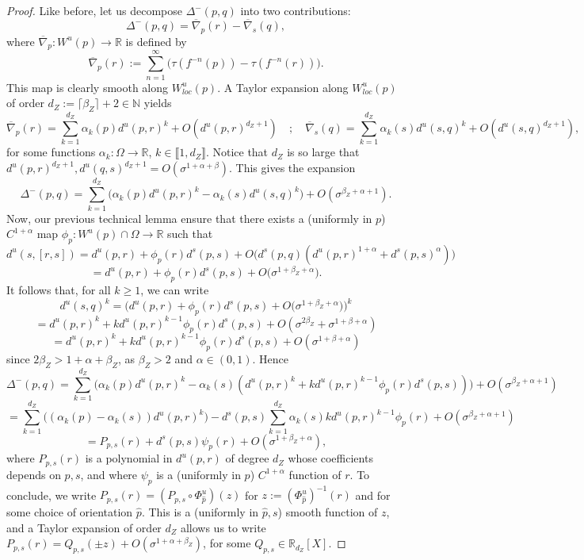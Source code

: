 \documentclass[a4paper]{article}
\theoremstyle{definition}
\begin{document}
\begin{proof}
Like before, let us decompose $\Delta^-(p,q)$ into two contributions:
$$ \Delta^-(p,q) = \overline{\nabla}_p(r) - \overline{\nabla}_s(q), $$
where $\overline{\nabla}_p: W^u(p) \rightarrow \mathbb{R}$ is defined by $$ \overline{\nabla}_p(r) := \sum_{n=1}^\infty \Big( \tau(f^{-n}(p)) - \tau(f^{-n}(r)) \Big) .$$
This map is clearly smooth along $W^u_{loc}(p)$. A Taylor expansion along $W^u_{loc}(p)$ of order $d_Z := \lceil \beta_Z \rceil + 2 \in \mathbb{N}$ yields
$$ \overline{\nabla}_p(r) = \sum_{k=1}^{d_Z} \alpha_k(p) d^u(p,r)^k + O(d^u(p,r)^{d_Z+1}) \quad ; \quad \overline{\nabla}_s(q) = \sum_{k=1}^{d_Z} \alpha_k(s) d^u(s,q)^k + O(d^u(s,q)^{d_Z+1}) ,$$
for some functions $\alpha_k : \Omega \rightarrow \mathbb{R}$, $k \in \llbracket 1,d_Z \rrbracket$. Notice that $d_Z$ is so large that $d^u(p,r)^{d_Z+1} , d^u(q,s)^{d_Z+1} = O(\sigma^{1+\alpha+\beta})$. This gives the expansion
$$ \Delta^-(p,q) = \sum_{k=1}^{d_Z} \Big( \alpha_k(p) d^u(p,r)^k - \alpha_k(s) d^u(s,q)^k \Big) + O(\sigma^{\beta_Z + \alpha + 1}) .$$
Now, our previous technical lemma ensure that there exists a (uniformly in $p$) $C^{1+\alpha}$ map $\phi_p : W^u(p) \cap \Omega \rightarrow \mathbb{R}$ such that
$$d^u(s,[r,s]) = d^u(p,r) + \phi_{p}(r) d^s(p,s) + O\Big( 
d^s(p,q)(d^u(p,r)^{1+\alpha} + d^s(p,s)^{\alpha}) \Big)$$
$$ = d^u(p,r) + \phi_{p}(r) d^s(p,s) + O\Big( 
\sigma^{1+\beta_Z+\alpha} \Big). $$
It follows that, for all $k \geq 1$, we can write
$$ d^u(s,q)^k = \Big( d^u(p,r) + \phi_{p}(r) d^s(p,s) + O\big( 
\sigma^{1+\beta_Z+\alpha} \big) \Big)^k $$
$$ = d^u(p,r)^k + k d^u(p,r)^{k-1} \phi_{p}(r) d^s(p,s) + O(\sigma^{2 \beta_Z} + \sigma^{1+\beta+\alpha}) $$
$$ = d^u(p,r)^k + k d^u(p,r)^{k-1} \phi_{p}(r) d^s(p,s) + O(\sigma^{1+\beta+\alpha})  $$
since $2 \beta_Z > 1 +\alpha + \beta_Z$, as $\beta_Z>2$ and $\alpha \in (0,1)$. Hence
$$ \Delta^-(p,q) = \sum_{k=1}^{d_Z} \Big( \alpha_k(p) d^u(p,r)^k - \alpha_k(s) (d^u(p,r)^k + k d^u(p,r)^{k-1} \phi_{p}(r) d^s(p,s)) \Big) + O(\sigma^{\beta_Z + \alpha + 1})  $$
$$ = \sum_{k=1}^{d_Z} \Big( (\alpha_k(p) - \alpha_k(s)) d^u(p,r)^k\Big) - d^s(p,s) \sum_{k=1}^{d_Z} \alpha_k(s)  k d^u(p,r)^{k-1} \phi_{p}(r)   + O(\sigma^{\beta_Z + \alpha + 1})  $$
$$ = P_{p,s}(r) + d^s(p,s) \psi_p(r) + O(\sigma^{1+\beta_Z+\alpha}) ,$$
where $P_{p,s}(r)$ is a polynomial in $d^u(p,r)$ of degree $d_Z$ whose coefficients depends on $p,s$, and where $\psi_p$ is a (uniformly in $p$) $C^{1+\alpha}$ function of $r$. To conclude, we write $P_{p,s}(r) = (P_{p,s} \circ \Phi_{\widehat{p}}^u)(z)$ for $z := (\Phi_{\widehat{p}}^u)^{-1}(r)$ and for some choice of orientation $\widehat{p}$. This is a (uniformly in $\widehat{p},s$) smooth function of $z$, and a Taylor expansion of order $d_Z$ allows us to write $P_{p,s}(r) = Q_{p,s}(\pm z) + O(\sigma^{1+\alpha+\beta_Z})$, for some $Q_{p,s} \in \mathbb{R}_{d_Z}[X]$. \end{proof}
\end{document}

